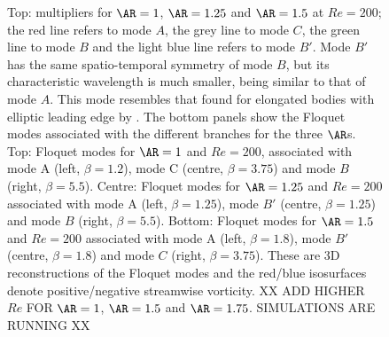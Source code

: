 \begin{figure}
  \caption{Top: multipliers for $\AR=1$, $\AR=1.25$ and $\AR=1.5$ at $Re=200$; the red line refers to mode $A$, the grey line to mode $C$, the green line to mode $B$ and the light blue line refers to mode $B'$. Mode $B'$ has the same spatio-temporal symmetry of mode $B$, but its characteristic wavelength is much smaller, being similar to that of mode $A$. This mode resembles that found for elongated bodies with elliptic leading edge by \cite{ryan-etal-2005}. The bottom panels show the Floquet modes associated with the different branches for the three $\AR$s. Top: Floquet modes for $\AR=1$ and $Re=200$, associated with mode A (left, $\beta=1.2$), mode C (centre, $\beta=3.75$) and mode $B$ (right, $\beta=5.5$). Centre: Floquet modes for $\AR=1.25$ and $Re=200$ associated with mode A (left, $\beta=1.25$), mode $B'$ (centre, $\beta = 1.25$) and mode $B$ (right, $\beta=5.5$). Bottom: Floquet modes for $\AR=1.5$ and $Re=200$ associated with mode A (left, $\beta=1.8$), mode $B'$ (centre, $\beta=1.8$) and mode $C$ (right, $\beta=3.75$). These are 3D reconstructions of the Floquet modes and the red/blue isosurfaces denote positive/negative streamwise vorticity. XX ADD HIGHER $Re$ FOR $\AR=1$, $\AR=1.5$ and $\AR=1.75$. SIMULATIONS ARE RUNNING XX}
  \label{fig:xx}
\end{figure}


